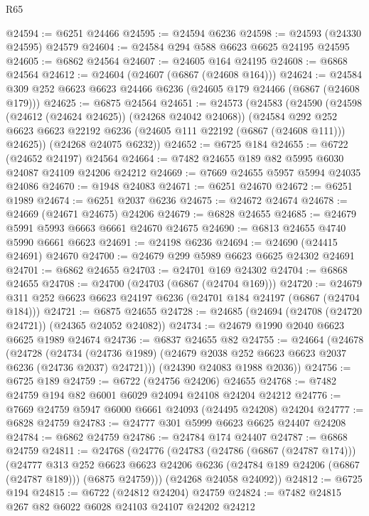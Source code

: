 \begin{lexlean}{R65}
\begin{coremodule}
{@24594 := @6251 @24466
@24595 := @24594 @6236
@24598 := @24593 (@24330 @24595) @24579
@24604 := @24584 @294 @588 @6623 @6625 @24195 @24595
@24605 := @6862 @24564
@24607 := @24605 @164 @24195
@24608 := @6868 @24564
@24612 := @24604 (@24607 (@6867 (@24608 @164)))
@24624 := @24584 @309 @252 @6623 @6623 @24466 @6236 (@24605 @179 @24466 (@6867 (@24608 @179)))
@24625 := @6875 @24564
@24651 := @24573
    (@24583
      (@24590
        (@24598 (@24612 (@24624 @24625)) (@24268 @24042 @24068))
        (@24584
          @292
          @252
          @6623
          @6623
          @22192
          @6236
          (@24605 @111 @22192 (@6867 (@24608 @111)))
          @24625))
      (@24268 @24075 @6232))
@24652 := @6725 @184
@24655 := @6722 (@24652 @24197) @24564
@24664 := @7482 @24655 @189 @82 @5995 @6030 @24087 @24109 @24206 @24212
@24669 := @7669 @24655 @5957 @5994 @24035 @24086
@24670 := @1948 @24083
@24671 := @6251 @24670
@24672 := @6251 @1989
@24674 := @6251 @2037 @6236
@24675 := @24672 @24674
@24678 := @24669 (@24671 @24675) @24206
@24679 := @6828 @24655
@24685 := @24679 @5991 @5993 @6663 @6661 @24670 @24675
@24690 := @6813 @24655 @4740 @5990 @6661 @6623
@24691 := @24198 @6236
@24694 := @24690 (@24415 @24691) @24670
@24700 := @24679 @299 @5989 @6623 @6625 @24302 @24691
@24701 := @6862 @24655
@24703 := @24701 @169 @24302
@24704 := @6868 @24655
@24708 := @24700 (@24703 (@6867 (@24704 @169)))
@24720 := @24679 @311 @252 @6623 @6623 @24197 @6236 (@24701 @184 @24197 (@6867 (@24704 @184)))
@24721 := @6875 @24655
@24728 := @24685 (@24694 (@24708 (@24720 @24721)) (@24365 @24052 @24082))
@24734 := @24679 @1990 @2040 @6623 @6625 @1989 @24674
@24736 := @6837 @24655 @82
@24755 := @24664
    (@24678
      (@24728
        (@24734 (@24736 @1989) (@24679 @2038 @252 @6623 @6623 @2037 @6236 (@24736 @2037) @24721)))
      (@24390 @24083 @1988 @2036))
@24756 := @6725 @189
@24759 := @6722 (@24756 @24206) @24655
@24768 := @7482 @24759 @194 @82 @6001 @6029 @24094 @24108 @24204 @24212
@24776 := @7669 @24759 @5947 @6000 @6661 @24093 (@24495 @24208) @24204
@24777 := @6828 @24759
@24783 := @24777 @301 @5999 @6623 @6625 @24407 @24208
@24784 := @6862 @24759
@24786 := @24784 @174 @24407
@24787 := @6868 @24759
@24811 := @24768
    (@24776
      (@24783
        (@24786 (@6867 (@24787 @174)))
        (@24777
          @313
          @252
          @6623
          @6623
          @24206
          @6236
          (@24784 @189 @24206 (@6867 (@24787 @189)))
          (@6875 @24759)))
      (@24268 @24058 @24092))
@24812 := @6725 @194
@24815 := @6722 (@24812 @24204) @24759
@24824 := @7482 @24815 @267 @82 @6022 @6028 @24103 @24107 @24202 @24212
}
\end{coremodule}
\end{lexlean}
